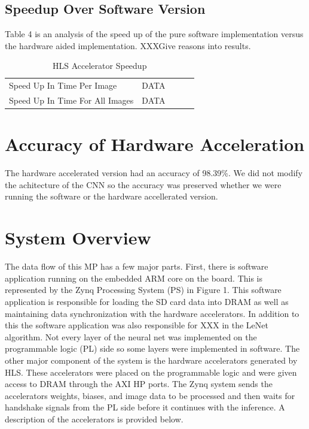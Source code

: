 \documentclass[10pt]{article}
\begin{document}
\subsection{Speedup Over Software Version}
Table 4 is an analysis  of the speed up of the pure software implementation versus the hardware aided implementation. XXXGive reasons into results.

\begin{table}[H]
\begin{center}
\caption{HLS Accelerator Speedup}
\begin{tabular}{lllll}
\cline{1-2}
\multicolumn{1}{|l|}{Speed Up  In Time Per Image}     & \multicolumn{1}{l|}{DATA}  \\ \cline{1-2}
\multicolumn{1}{|l|}{Speed Up In Time For All Images} & \multicolumn{1}{l|}{DATA}  \\ \cline{1-2}
\end{tabular}
\end{center}
\end{table}

\section{Accuracy of Hardware Acceleration}
The hardware accelerated version had an accuracy of 98.39\%. We did not modify the achitecture of the CNN so the accuracy was preserved whether we were running the software or the hardware accellerated version.

\section{System Overview}
The data flow of this MP has a few major parts. First, there is software application running on the embedded ARM core on the board. This is represented by the Zynq Processing System (PS) in Figure 1.  This software application is responsible for loading the SD card data into DRAM as well as maintaining data synchronization with the hardware accelerators. In addition to this the software application was also responsible for XXX in the LeNet algorithm. Not every layer of the neural net was implemented on the programmable logic (PL) side so some layers were implemented in software. The other major component of the system is the hardware accelerators generated by HLS. These accelerators were placed on the programmable logic and were given access to DRAM through the AXI HP ports. The Zynq system sends the accelerators weights, biases, and image data to be processed and then waits for handshake signals from the PL side before it continues with the inference. A description of the accelerators is provided below. 
\end{document}

